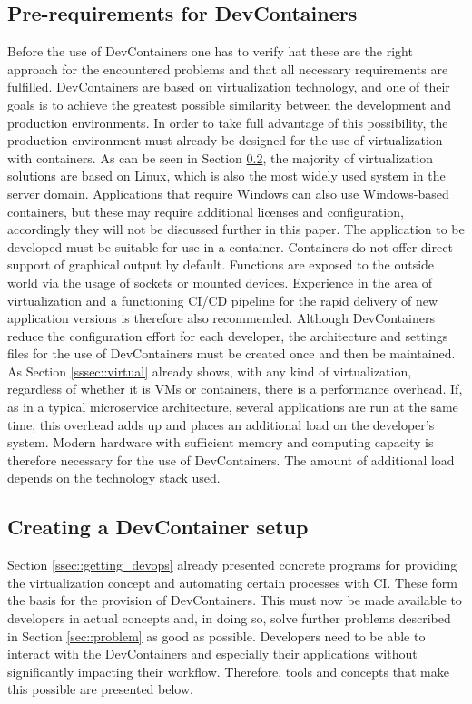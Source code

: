 \documentclass[12pt, a4paper]{article}
\begin{document}
    \subsection{Pre-requirements for DevContainers}
    Before the use of DevContainers one has to verify hat these are the right approach for the encountered problems and that all necessary requirements are fulfilled.\newline
    DevContainers are based on virtualization technology, and one of their goals is to achieve the greatest possible similarity between the development and production environments. In order to take full advantage of this possibility, the production environment must already be designed for the use of virtualization with containers.  As can be seen in Section \ref{ssec::toolsused}, the majority of virtualization solutions are based on Linux, which is also the most widely used system in the server domain. Applications that require Windows can also use Windows-based containers, but these may require additional licenses and configuration, accordingly they will not be discussed further in this paper. The application to be developed must be suitable for use in a container. Containers do not offer direct support of graphical output by default. Functions are exposed to the outside world via the usage of sockets or mounted devices. Experience in the area of virtualization and a functioning \ac{CI}/\ac{CD} pipeline for the rapid delivery of new application versions is therefore also recommended.\newline
    Although DevContainers reduce the configuration effort for each developer, the architecture and settings files for the use of DevContainers must be created once and then be maintained. As Section \ref{sssec::virtual} already shows, with any kind of virtualization, regardless of whether it is VMs or containers, there is a performance overhead. If, as in a typical microservice architecture, several applications are run at the same time, this overhead adds up and places an additional load on the developer's system. Modern hardware with sufficient memory and computing capacity is therefore necessary for the use of DevContainers. The amount of additional load depends on the technology stack used.

    \subsection{Creating a DevContainer setup}\label{ssec::toolsused}
    Section \ref{ssec::getting_devops} already presented concrete programs for providing the virtualization concept and automating certain processes with \ac{CI}. These form the basis for the provision of DevContainers. This must now be made available to developers in actual concepts and, in doing so, solve further problems described in Section \ref{sec::problem} as good as possible. Developers need to be able to interact with the DevContainers and especially their applications without significantly impacting their workflow. Therefore, tools and concepts that make this possible are presented below.
\end{document}
